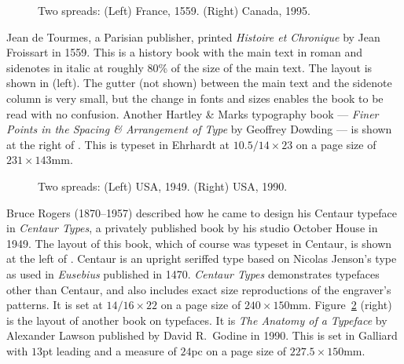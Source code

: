 \documentclass[10pt,letterpaper]{memoir}
\newlength{\pwlayi}\setlength{\pwlayi}{0.45\textwidth} %
\newlength{\pwlayii}\setlength{\pwlayii}{0.45\pwlayi}
\begin{document}
\begin{figure}
\centering
\begin{minipage}[b]{\pwlayi}
\end{minipage}
\hfill
\begin{minipage}[b]{\pwlayi}
\end{minipage}
\caption[Two spreads: France, 1559 and Canada, 1995]%
        {Two spreads: (Left) France, 1559.
         (Right) Canada, 1995.} \label{fb:3}
\end{figure}

   Jean de Tourmes, a Parisian publisher, printed \textit{Histoire et Chronique}
by Jean Froissart in 1559. This is a history book with the main text in
roman and sidenotes in italic at roughly 80\% of the size of the main text.
The layout is shown in  (left). The gutter (not shown) between the main
text and the sidenote column is very small, but the change in fonts and sizes
enables the book to be read with no confusion. Another Hartley \& Marks
typography book --- \textit{Finer Points in the Spacing \& Arrangement
of Type} by Geoffrey Dowding --- is shown at the right of .
This is typeset in Ehrhardt at $10.5/14 \times 23$ on a page size of
$231 \times 143$mm.



\begin{figure}
\centering
\begin{minipage}[b]{\pwlayi}
\end{minipage}
\hfill
\begin{minipage}[b]{\pwlayi}
\end{minipage}
\caption[Two spreads: USA, 1949 and 1990]%
        {Two spreads: (Left) USA, 1949.
         (Right) USA, 1990.} \label{fb:4}
\end{figure}

    Bruce Rogers (1870--1957) described how he came to design his 
Centaur typeface in
\textit{Centaur Types}, a privately published book by his studio October
House in 1949. The layout of this book, which of course was typeset in
Centaur, is shown at the left of . Centaur is an upright
seriffed type based on Nicolas Jenson's type as used in \textit{Eusebius}
published in 1470. \textit{Centaur Types} demonstrates typefaces other than
Centaur, and also includes exact size reproductions of the engraver's 
patterns. It is set at $14/16 \times 22$ on a page size of $240 \times 150$mm.
Figure~\ref{fb:4} (right) is the layout of another book on typefaces.
It is \textit{The Anatomy of a Typeface} by Alexander Lawson published by
David R.~Godine in 1990.
This is set in Galliard with $13$pt leading and a measure of $24$pc on
a page size of $227.5 \times 150$mm.
\end{document}
